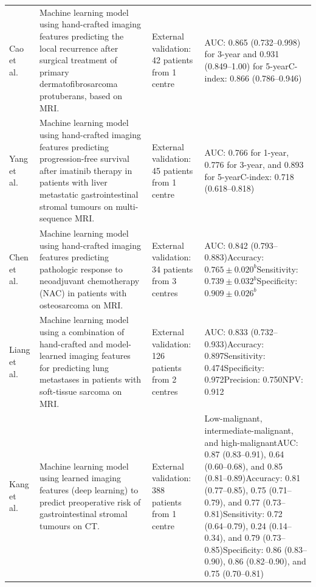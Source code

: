 \begin{landscape}
\begin{longtable}{@{}p{1.7cm}p{6.0cm}p{3.5cm}p{6.2cm}@{}}
	\addlinespace
	Cao et al.~\autocite{cao2023} & Machine learning model using hand-crafted imaging features predicting the local recurrence after surgical treatment of primary dermatofibrosarcoma protuberans, based on MRI. & External validation: 42 patients from 1 centre & AUC: 0.865 (0.732--0.998) for 3-year and 0.931 (0.849--1.00) for 5-year\newline C-index: 0.866 (0.786--0.946) \\
	\addlinespace
	Yang et al.~\autocite{yang2024} & Machine learning model using hand-crafted imaging features predicting progression-free survival after imatinib therapy in patients with liver metastatic gastrointestinal stromal tumours on multi-sequence MRI. & External validation: 45 patients from 1 centre & AUC: 0.766 for 1-year, 0.776 for 3-year, and 0.893 for 5-year\newline C-index: 0.718 (0.618--0.818) \\
	\addlinespace
	Chen et al.~\autocite{chen2021} & Machine learning model using hand-crafted imaging features predicting pathologic response to neoadjuvant chemotherapy (NAC) in patients with osteosarcoma on MRI. & External validation: 34 patients from 3 centres & AUC: 0.842 (0.793--0.883)\newline Accuracy: $0.765 \pm 0.020^b$\newline Sensitivity: $0.739 \pm 0.032^b$\newline Specificity: $0.909 \pm 0.026^b$ \\
	\addlinespace
	Liang et al.~\autocite{liang2022} & Machine learning model using a combination of hand-crafted and model-learned imaging features for predicting lung metastases in patients with soft-tissue sarcoma on MRI. & External validation: 126 patients from 2 centres & AUC: 0.833 (0.732--0.933)\newline Accuracy: 0.897\newline Sensitivity: 0.474\newline Specificity: 0.972\newline Precision: 0.750\newline NPV: 0.912 \\
	\addlinespace
	Kang et al.~\autocite{kang2021} & Machine learning model using learned imaging features (deep learning) to predict preoperative risk of gastrointestinal stromal tumours on CT. & External validation: 388 patients from 1 centre & Low-malignant, intermediate-malignant, and high-malignant\newline AUC: 0.87 (0.83--0.91), 0.64 (0.60--0.68), and 0.85 (0.81--0.89)\newline Accuracy: 0.81 (0.77--0.85), 0.75 (0.71--0.79), and 0.77 (0.73--0.81)\newline Sensitivity: 0.72 (0.64--0.79), 0.24 (0.14--0.34), and 0.79 (0.73--0.85)\newline Specificity: 0.86 (0.83--0.90), 0.86 (0.82--0.90), and 0.75 (0.70--0.81) \\

\end{longtable}
\end{landscape}
